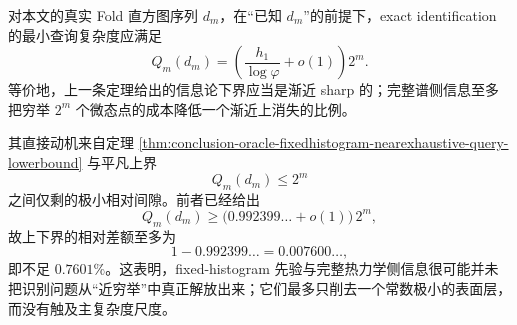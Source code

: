 \begin{conjecture}[近穷举刚性]\label{conj:conclusion-oracle-nearexhaustive-rigidity}
对本文的真实 Fold 直方图序列 \(d_m\)，在“已知 \(d_m\)”的前提下，exact identification 的最小查询复杂度应满足
\[
Q_m(d_m)
=
\left(\frac{h_1}{\log\varphi}+o(1)\right)2^m.
\]
等价地，上一条定理给出的信息论下界应当是渐近 sharp 的；完整谱侧信息至多把穷举 \(2^m\) 个微态点的成本降低一个渐近上消失的比例。
\end{conjecture}

其直接动机来自定理 \ref{thm:conclusion-oracle-fixedhistogram-nearexhaustive-query-lowerbound} 与平凡上界
\[
Q_m(d_m)\le 2^m
\]
之间仅剩的极小相对间隙。前者已经给出
\[
Q_m(d_m)\ge \bigl(0.992399\ldots+o(1)\bigr)\,2^m,
\]
故上下界的相对差额至多为
\[
1-0.992399\ldots=0.007600\ldots,
\]
即不足 \(0.7601\%\)。这表明，fixed-histogram 先验与完整热力学侧信息很可能并未把识别问题从“近穷举”中真正解放出来；它们最多只削去一个常数极小的表面层，而没有触及主复杂度尺度。
